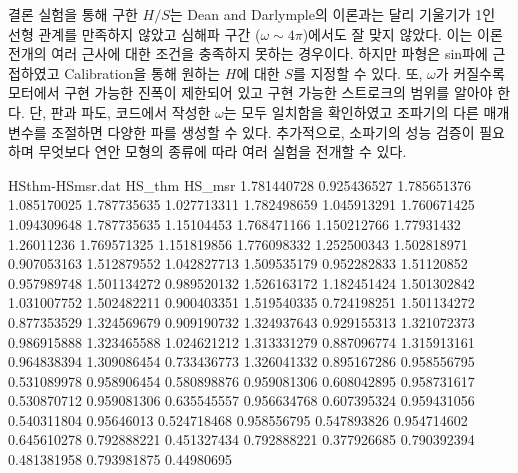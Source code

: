 \documentclass[Junlampaper, portrait]{Junlam_PosterK}
\begin{document}
\begin{poster}
\begin{posterbox}[name=result,column=3,]{결론  }
    \scriptsize{
    실험을 통해 구한 $H/S$는 Dean and Darlymple의 이론과는 달리 기울기가 1인 선형 관계를 만족하지 않았고 심해파 구간 ($\omega\sim4\pi$)에서도 잘 맞지 않았다. 이는 이론 전개의 여러 근사에 대한 조건을 충족하지 못하는 경우이다. 하지만 파형은 sin파에 근접하였고 Calibration을 통해 원하는 $H$에 대한 $S$를 지정할 수 있다. 또, $\omega$가 커질수록 모터에서 구현 가능한 진폭이 제한되어 있고 구현 가능한 스트로크의 범위를 알아야 한다. 단, 판과 파도, 코드에서 작성한 $\omega$는 모두 일치함을 확인하였고 조파기의 다른 매개변수를 조절하면 다양한 파를 생성할 수 있다. 추가적으로, 소파기의 성능 검증이 필요하며 무엇보다 연안 모형의 종류에 따라 여러 실험을 전개할 수 있다. \\}
  
        \begin{filecontents}{HSthm-HSmsr.dat}
                HS_thm	HS_msr
                1.781440728	0.925436527
                1.785651376	1.085170025
                1.787735635	1.027713311
                1.782498659	1.045913291
                1.760671425	1.094309648
                1.787735635	1.15104453
                1.768471166	1.150212766
                1.77931432	1.26011236
                1.769571325	1.151819856
                1.776098332	1.252500343
                1.502818971	0.907053163
                1.512879552	1.042827713
                1.509535179	0.952282833
                1.51120852	0.957989748
                1.501134272	0.989520132
                1.526163172	1.182451424
                1.501302842	1.031007752
                1.502482211	0.900403351
                1.519540335	0.724198251
                1.501134272	0.877353529
                1.324569679	0.909190732
                1.324937643	0.929155313
                1.321072373	0.986915888
                1.323465588	1.024621212
                1.313331279	0.887096774
                1.315913161	0.964838394
                1.309086454	0.733436773
                1.326041332	0.895167286
                0.958556795	0.531089978
                0.958906454	0.580898876
                0.959081306	0.608042895
                0.958731617	0.530870712
                0.959081306	0.635545557
                0.956634768	0.607395324
                0.959431056	0.540311804
                0.95646013	0.524718468
                0.958556795	0.547893826
                0.954714602	0.645610278
                0.792888221	0.451327434
                0.792888221	0.377926685
                0.790392394	0.481381958
                0.793981875	0.44980695

\end{filecontents}
\end{posterbox}
\end{poster}
\end{document}

